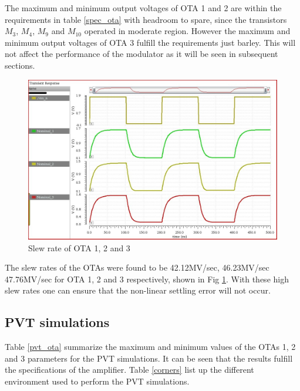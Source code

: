 The maximum and minimum output voltages of OTA 1 and 2 are within the requirements in table \ref{spec_ota} with headroom to spare, since the transistors $M_3$, $M_4$, $M_9$ and $M_10$ operated in moderate region. However the maximum and minimum output voltages of OTA 3 fulfill the requirements just barley. This will not affect the performance of the modulator as it will be seen in subsequent sections. 
\begin{figure}[H]
\centering
\includegraphics[width=\textwidth]{images/nominal_slew_rate_1_2_3.jpg}
\caption{Slew rate of OTA 1, 2 and 3 }
\label{slew_rate_out}
\end{figure}

The slew rates of the OTAs were found to be 42.12MV/sec, 46.23MV/sec 47.76MV/sec for OTA 1, 2 and 3 respectively, shown in Fig \ref{slew_rate_out}. With these high slew rates one can ensure that the non-linear settling error will not occur. 



\subsection{PVT simulations}
Table \ref{pvt_ota} summarize the maximum and minimum values of the OTAs 1, 2 and 3 parameters for the PVT simulations. It can be seen that the results fulfill the specifications of the amplifier. Table \ref{corners} list up the different environment used to perform the PVT simulations.


